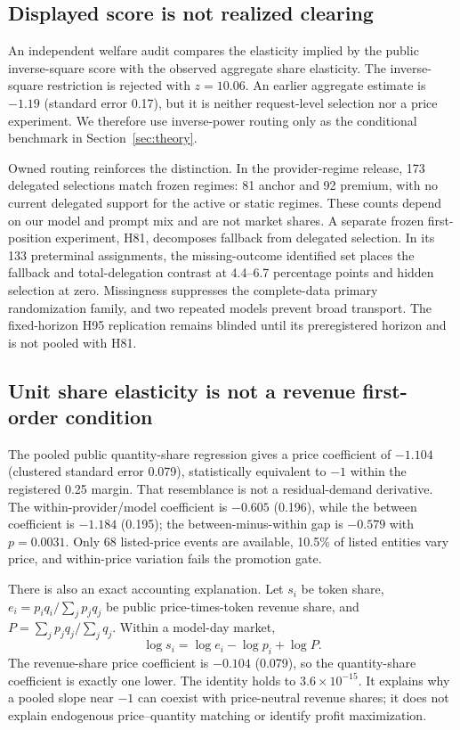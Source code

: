 \documentclass[sigconf,nonacm]{acmart}
\newcommand{\1}{\mathbf 1}
\begin{document}
\subsection{Displayed score is not realized clearing}

An independent welfare audit compares the elasticity implied by the public
inverse-square score with the observed aggregate share elasticity.  The
inverse-square restriction is rejected with $z=10.06$.  An earlier aggregate
estimate is $-1.19$ (standard error 0.17), but it is neither request-level
selection nor a price experiment.  We therefore use inverse-power routing only
as the conditional benchmark in Section~\ref{sec:theory}.

Owned routing reinforces the distinction.  In the provider-regime release, 173
delegated selections match frozen regimes: 81 anchor and 92 premium, with no
current delegated support for the active or static regimes.  These counts
depend on our model and prompt mix and are not market shares.  A separate frozen
first-position experiment, H81, decomposes
fallback from delegated selection.  In its 133 preterminal assignments, the
missing-outcome identified set places the fallback and total-delegation contrast
at 4.4--6.7 percentage points and hidden selection at zero.  Missingness
suppresses the complete-data primary randomization family, and two repeated
models prevent broad transport.  The fixed-horizon H95 replication remains
blinded until its preregistered horizon and is not pooled with H81.

\subsection{Unit share elasticity is not a revenue first-order condition}

The pooled public quantity-share regression gives a price coefficient of
$-1.104$ (clustered standard error 0.079), statistically equivalent to $-1$
within the registered 0.25 margin.  That resemblance is not a residual-demand
derivative.  The within-provider/model coefficient is $-0.605$ (0.196), while
the between coefficient is $-1.184$ (0.195); the between-minus-within gap is
$-0.579$ with $p=0.0031$.  Only 68 listed-price events are available, 10.5\% of
listed entities vary price, and within-price variation fails the promotion gate.

There is also an exact accounting explanation.  Let $s_i$ be token share,
$e_i=p_iq_i/\sum_jp_jq_j$ be public price-times-token revenue share, and
$P=\sum_jp_jq_j/\sum_jq_j$.  Within a model-day market,
\begin{equation}
\log s_i=\log e_i-\log p_i+\log P.
\label{eq:revenueidentity}
\end{equation}
The revenue-share price coefficient is $-0.104$ (0.079), so the quantity-share
coefficient is exactly one lower.  The identity holds to
$3.6\times10^{-15}$.  It explains why a pooled slope near $-1$ can coexist with
price-neutral revenue shares; it does not explain endogenous price--quantity
matching or identify profit maximization.
\end{document}
